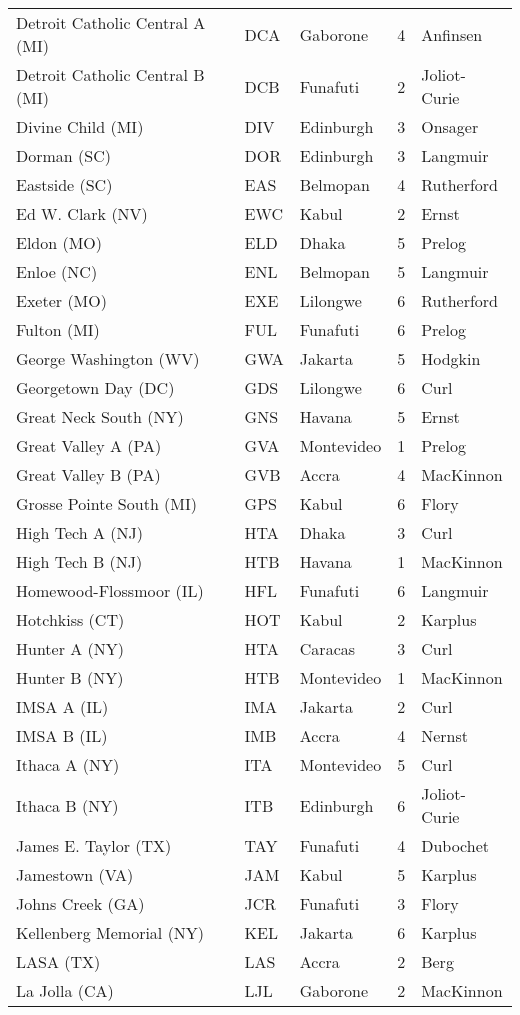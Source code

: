 \documentclass{article}%
\begin{document}
\begin{longtable}{|ll|ll|l|}
Detroit Catholic Central A (MI)&DCA&Gaborone&4&Anfinsen\\%
Detroit Catholic Central B (MI)&DCB&Funafuti&2&Joliot{-}Curie\\%
Divine Child (MI)&DIV&Edinburgh&3&Onsager\\%
Dorman (SC)&DOR&Edinburgh&3&Langmuir\\%
Eastside (SC)&EAS&Belmopan&4&Rutherford\\%
Ed W. Clark (NV)&EWC&Kabul&2&Ernst\\%
Eldon (MO)&ELD&Dhaka&5&Prelog\\%
Enloe (NC)&ENL&Belmopan&5&Langmuir\\%
Exeter (MO)&EXE&Lilongwe&6&Rutherford\\%
Fulton (MI)&FUL&Funafuti&6&Prelog\\%
George Washington (WV)&GWA&Jakarta&5&Hodgkin\\%
Georgetown Day (DC)&GDS&Lilongwe&6&Curl\\%
Great Neck South (NY)&GNS&Havana&5&Ernst\\%
Great Valley A (PA)&GVA&Montevideo&1&Prelog\\%
Great Valley B (PA)&GVB&Accra&4&MacKinnon\\%
Grosse Pointe South (MI)&GPS&Kabul&6&Flory\\%
High Tech A (NJ)&HTA&Dhaka&3&Curl\\%
High Tech B (NJ)&HTB&Havana&1&MacKinnon\\%
Homewood{-}Flossmoor (IL)&HFL&Funafuti&6&Langmuir\\%
Hotchkiss (CT)&HOT&Kabul&2&Karplus\\%
Hunter A (NY)&HTA&Caracas&3&Curl\\%
Hunter B (NY)&HTB&Montevideo&1&MacKinnon\\%
IMSA A (IL)&IMA&Jakarta&2&Curl\\%
IMSA B (IL)&IMB&Accra&4&Nernst\\%
Ithaca A (NY)&ITA&Montevideo&5&Curl\\%
Ithaca B (NY)&ITB&Edinburgh&6&Joliot{-}Curie\\%
James E. Taylor (TX)&TAY&Funafuti&4&Dubochet\\%
Jamestown (VA)&JAM&Kabul&5&Karplus\\%
Johns Creek (GA)&JCR&Funafuti&3&Flory\\%
Kellenberg Memorial (NY)&KEL&Jakarta&6&Karplus\\%
LASA (TX)&LAS&Accra&2&Berg\\%
La Jolla (CA)&LJL&Gaborone&2&MacKinnon\\%

\end{longtable}
\end{document}
